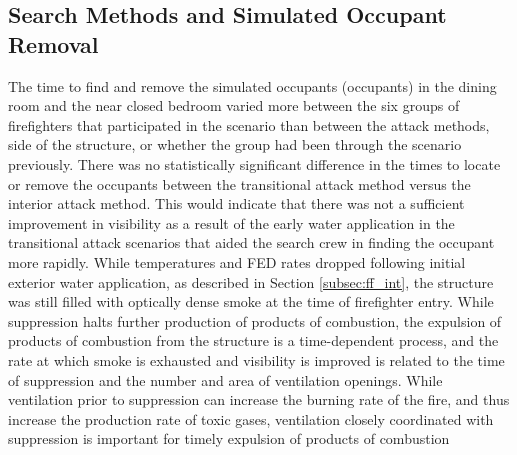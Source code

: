 \documentclass[12pt,oneside]{article}
\begin{document}
\subsection{Search Methods and Simulated Occupant Removal}
\label{subsec:search}
The time to find and remove the simulated occupants (occupants) in the dining room and the near closed bedroom varied more between the six groups of firefighters that participated in the scenario than between the attack methods, side of the structure, or whether the group had been through the scenario previously. There was no statistically significant difference in the times to locate or remove the occupants between the transitional attack method versus the interior attack method. This would indicate that there was not a sufficient improvement in visibility as a result of the early water application in the transitional attack scenarios that aided the search crew in finding the occupant more rapidly. While temperatures and FED rates dropped following initial exterior water application, as described in Section \ref{subsec:ff_int}, the structure was still filled with optically dense smoke at the time of firefighter entry. While suppression halts further production of products of combustion, the expulsion of products of combustion from the structure is a time-dependent process, and the rate at which smoke is exhausted and visibility is improved is related to the time of suppression and the number and area of ventilation openings. While ventilation prior to suppression can increase the burning rate of the fire, and thus increase the production rate of toxic gases, ventilation closely coordinated with suppression is important for timely expulsion of products of combustion
\end{document}
